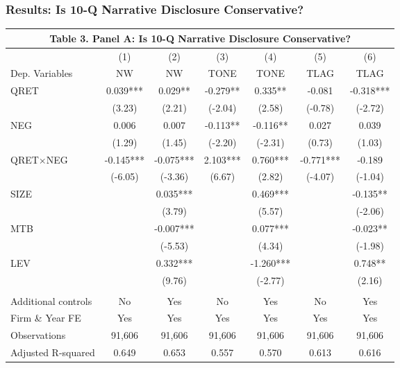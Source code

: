 \documentclass{beamer}
\begin{document}
\begin{frame}
\frametitle{Results: Is 10-Q Narrative Disclosure Conservative?}

\begin{table}[H] \label{T3PA}
	\begin{center} \scriptsize
		\begin{tabular}{lcccccc}
			\multicolumn{7}{c}{\textbf{Table 3. Panel A: Is 10-Q Narrative Disclosure Conservative?}} \\
			\toprule
			\toprule
			& (1) & (2) & (3) & (4) & (5) & (6) \\
			Dep. Variables & NW & NW & TONE & TONE & TLAG & TLAG \\
			\midrule

			QRET & 0.039*** & 0.029** & -0.279** & 0.335** & -0.081 & -0.318*** \\
			& (3.23) & (2.21) & (-2.04) & (2.58) & (-0.78) & (-2.72) \\
			NEG & 0.006 & 0.007 & -0.113** & -0.116** & 0.027 & 0.039 \\
			& (1.29) & (1.45) & (-2.20) & (-2.31) & (0.73) & (1.03) \\
			 QRET$\times$NEG & -0.145*** & -0.075*** & 2.103*** & 0.760*** & -0.771*** & -0.189 \\
			 & (-6.05) & (-3.36) & (6.67) & (2.82) & (-4.07) & (-1.04) \\
			SIZE &   & 0.035*** &   & 0.469*** &   & -0.135** \\
			&   & (3.79) &   & (5.57) &   & (-2.06) \\
			MTB &   & -0.007*** &   & 0.077*** &   & -0.023** \\
			&   & (-5.53) &   & (4.34) &   & (-1.98) \\
			LEV &   & 0.332*** &   & -1.260*** &   & 0.748** \\
			&   & (9.76) &   & (-2.77) &   & (2.16) \\



			&   &   &   &   &   &  \\
			Additional controls & No & Yes & No & Yes & No & Yes \\
			Firm \& Year FE & Yes & Yes & Yes & Yes & Yes & Yes  \\
			Observations & 91,606 & 91,606 & 91,606 & 91,606 & 91,606 & 91,606 \\
			Adjusted R-squared & 0.649 & 0.653 & 0.557 & 0.570 & 0.613 & 0.616 \\
			\bottomrule
			\bottomrule
		\end{tabular}%
	\end{center}

\end{table}%

\end{frame}
\end{document}
